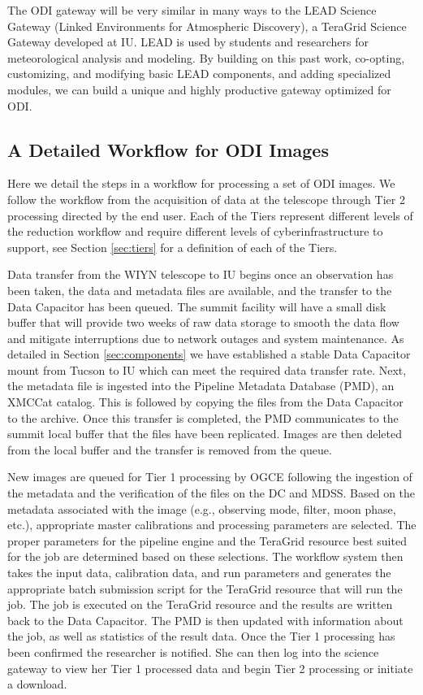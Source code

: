 \documentclass[10pt,conference]{IEEEtran}
\begin{document}
The ODI gateway will be very similar in many ways to the LEAD Science Gateway (Linked Environments for Atmospheric Discovery), a TeraGrid Science Gateway developed at IU. LEAD is used by students and researchers for meteorological analysis and modeling. By building on this past work, co-opting, customizing, and modifying basic LEAD components, and adding specialized modules, we can build a unique and highly productive gateway optimized for ODI.

\subsection{A Detailed Workflow for ODI Images}\label{sec:workflow}

Here we detail the steps in a workflow for processing a set of ODI images. We follow the workflow from the acquisition of data at the telescope through Tier 2 processing directed by the end user. Each of the Tiers represent different levels of the reduction workflow and require different levels of cyberinfrastructure to support, see Section \ref{sec:tiers} for a definition of each of the Tiers.

Data transfer from the WIYN telescope to IU begins once an observation has been taken, the data and metadata files are available, and the transfer to the Data Capacitor has been queued. 
The summit facility will have a small disk buffer that will provide two weeks of raw data storage to smooth the data flow and mitigate interruptions due to network outages and system maintenance. As detailed in Section \ref{sec:components} we have established a stable Data Capacitor mount from Tucson to IU which can meet the required data transfer rate. Next, the metadata file is ingested into the Pipeline Metadata Database (PMD), an XMCCat catalog. This is followed by copying the files from the Data Capacitor to the archive. Once this transfer is completed, the PMD communicates to the summit local buffer that the files have been replicated. Images are then deleted from the local buffer and the transfer is removed from the queue.

New images are queued for Tier 1 processing by OGCE following the ingestion of the metadata and the verification of the files on the DC and MDSS. Based on the metadata associated with the image (e.g., observing mode, filter, moon phase, etc.), appropriate master calibrations and processing parameters are selected. The proper parameters for the pipeline engine and the TeraGrid resource best suited for the job are determined based on these selections. The workflow system then takes the input data, calibration data, and run parameters and generates the appropriate batch submission script for the TeraGrid resource that will run the job. The job is executed on the TeraGrid resource and the results are written back to the Data Capacitor. The PMD is then updated with information about the job, as well as statistics of the result data. Once the Tier 1 processing has been confirmed the researcher is notified. She can then log into the science gateway to view her Tier 1 processed data and begin Tier 2 processing or initiate a download.
\end{document}
